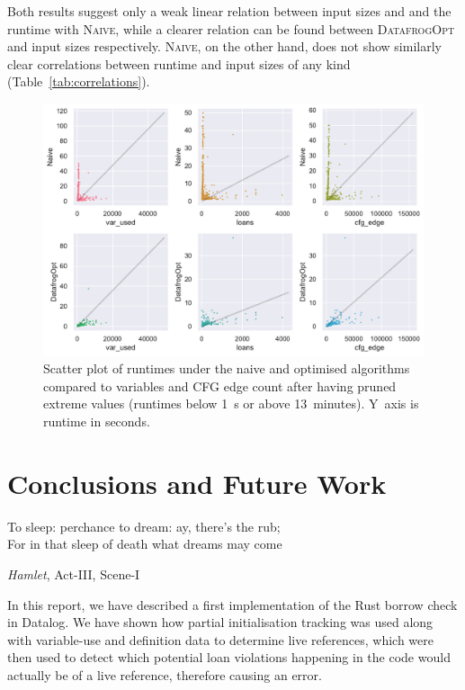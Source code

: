 \documentclass[11pt,a4paper,twoside,openany]{report}
\renewcommand\_{\textunderscore\allowbreak}
\begin{document}
Both results suggest only a weak linear relation between input sizes and
and the runtime with \textsc{Naive}, while a clearer relation can be
found between \textsc{DatafrogOpt} and input sizes respectively. \textsc{Naive},
on the other hand, does not show similarly clear correlations between runtime
and input sizes of any kind (Table~\ref{tab:correlations}).

\begin{figure}
  \includegraphics[width=0.9\linewidth]{Graphs/corr_scatter.pdf}
  \caption[Scatter Plot of Runtimes On Two Polonius Variants vs.\ nr.\ of CFG
  Edges and Variables]{Scatter plot of runtimes under the naive and optimised
    algorithms compared to variables and CFG edge count after having pruned
    extreme values (runtimes below 1~s or above 13~minutes). Y~axis is runtime
    in seconds.}\label{fig:input-scatter}
\end{figure}

\chapter{Conclusions and Future Work}\label{cha:conclusions}
\epigraph{To sleep: perchance to dream: ay, there's the rub;\\
  For in that sleep of death what dreams may come}%
{\textit{Hamlet}, Act-III, Scene-I}

In this report, we have described a first implementation of the Rust borrow
check in Datalog. We have shown how partial initialisation tracking was used
along with variable-use and definition data to determine live references, which
were then used to detect which potential loan violations happening in the code
would actually be of a live reference, therefore causing an error.
\end{document}
